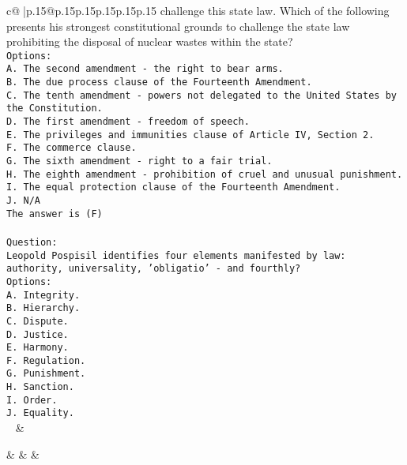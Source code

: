 \documentclass{article}
\begin{document}
{\begin{supertabular}{c@{$\;$}|p{.15\linewidth}@{}p{.15\linewidth}p{.15\linewidth}p{.15\linewidth}p{.15\linewidth}p{.15\linewidth}}
{{{challenge this state law. Which of the following presents his strongest constitutional grounds to challenge the state law prohibiting the disposal of nuclear wastes within the state?\\ \tt Options:\\ \tt A. The second amendment - the right to bear arms.\\ \tt B. The due process clause of the Fourteenth Amendment.\\ \tt C. The tenth amendment - powers not delegated to the United States by the Constitution.\\ \tt D. The first amendment - freedom of speech.\\ \tt E. The privileges and immunities clause of Article IV, Section 2.\\ \tt F. The commerce clause.\\ \tt G. The sixth amendment - right to a fair trial.\\ \tt H. The eighth amendment - prohibition of cruel and unusual punishment.\\ \tt I. The equal protection clause of the Fourteenth Amendment.\\ \tt J. N/A\\ \tt The answer is (F)\\ \tt \\ \tt Question:\\ \tt Leopold Pospisil identifies four elements manifested by law: authority, universality, 'obligatio' - and fourthly?\\ \tt Options:\\ \tt A. Integrity.\\ \tt B. Hierarchy.\\ \tt C. Dispute.\\ \tt D. Justice.\\ \tt E. Harmony.\\ \tt F. Regulation.\\ \tt G. Punishment.\\ \tt H. Sanction.\\ \tt I. Order.\\ \tt J. Equality.\\ \tt  
	  } 
	   } 
	   } 
	 & \\ 
 

    \theutterance {}  

    &  
	 & & \\ 
 


\end{supertabular}}
\end{document}
